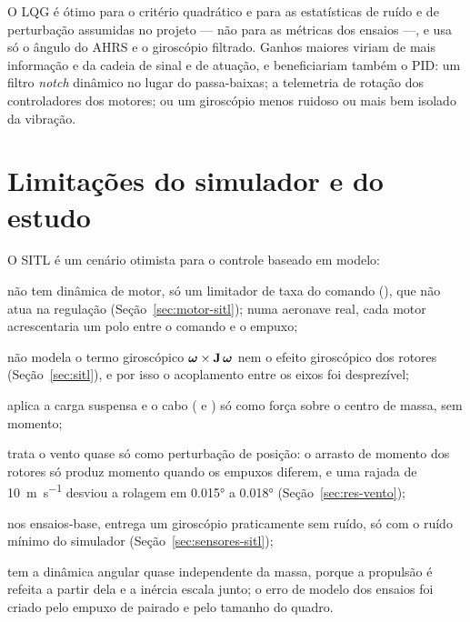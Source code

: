 O LQG é ótimo para o critério quadrático e para as estatísticas de ruído e
de perturbação assumidas no projeto --- não para as métricas dos ensaios ---,
e usa só o ângulo do AHRS e o giroscópio filtrado. Ganhos maiores viriam de
mais informação e da cadeia de sinal e de atuação, e beneficiariam também o
PID: um
filtro \textit{notch} dinâmico no lugar do passa-baixas; a telemetria de rotação dos controladores dos motores; ou um
giroscópio menos ruidoso ou mais bem isolado da vibração.

\section{Limitações do simulador e do estudo}
\label{sec:limitacoes}

O SITL é um cenário otimista para o controle baseado em modelo:
\begin{alineas}
    \item não tem dinâmica de motor, só um limitador de taxa do comando
          (), que não atua na regulação
          (Seção~\ref{sec:motor-sitl}); numa aeronave real, cada motor
          acrescentaria um polo entre o comando e o empuxo;
    \item não modela o termo giroscópico
          $\bm{\omega}\times\mathbf{J}\,\bm{\omega}$ nem o efeito
          giroscópico dos rotores (Seção~\ref{sec:sitl}), e por isso o
          acoplamento entre os eixos foi desprezível;
    \item aplica a carga suspensa e o cabo ( e
          ) só como força sobre o centro de massa, sem
          momento;
    \item trata o vento quase só como perturbação de posição: o arrasto de
          momento dos rotores só produz momento quando os empuxos diferem, e
          uma rajada de \SI{10}{\metre\per\second} desviou a rolagem em
          \ang{0.015} a \ang{0.018} (Seção~\ref{sec:res-vento});
    \item nos ensaios-base, entrega um giroscópio praticamente sem ruído,
          só com o ruído mínimo do simulador (Seção~\ref{sec:sensores-sitl});
    \item tem a dinâmica angular quase independente da massa, porque a
          propulsão é refeita a partir dela e a inércia escala junto; o erro
          de modelo dos ensaios foi criado pelo empuxo de pairado e pelo
          tamanho do quadro.
\end{alineas}

